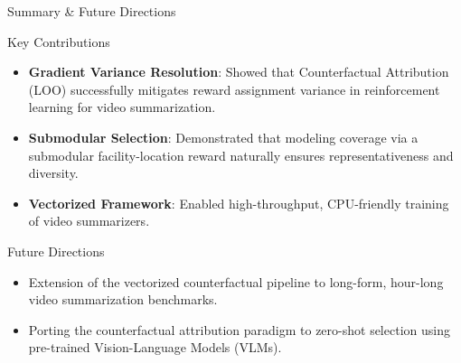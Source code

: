 \documentclass[aspectratio=169]{beamer}
\begin{document}
\begin{frame}{Summary \& Future Directions}
    \begin{block}{Key Contributions}
        \begin{itemize}
            \item \textbf{Gradient Variance Resolution}: Showed that Counterfactual Attribution (LOO) successfully mitigates reward assignment variance in reinforcement learning for video summarization.
            \item \textbf{Submodular Selection}: Demonstrated that modeling coverage via a submodular facility-location reward naturally ensures representativeness and diversity.
            \item \textbf{Vectorized Framework}: Enabled high-throughput, CPU-friendly training of video summarizers.
        \end{itemize}
    \end{block}
    
    \begin{block}{Future Directions}
        \begin{itemize}
            \item Extension of the vectorized counterfactual pipeline to long-form, hour-long video summarization benchmarks.
            \item Porting the counterfactual attribution paradigm to zero-shot selection using pre-trained Vision-Language Models (VLMs).
        \end{itemize}
    \end{block}
\end{frame}
\end{document}
